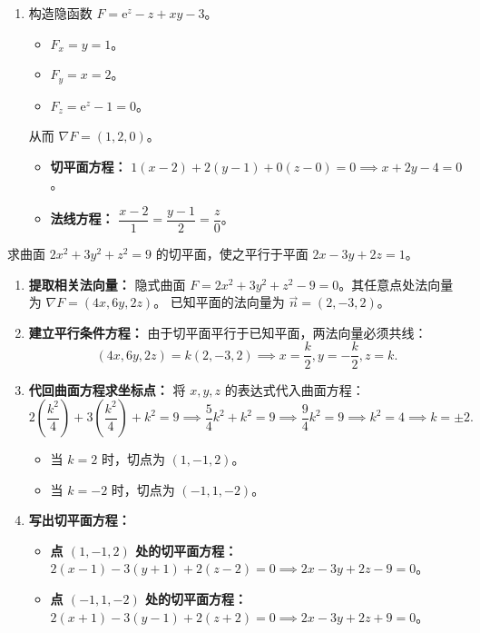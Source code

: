 \documentclass[lang=cn,11pt]{elegantbook}
\begin{document}
\begin{solution}
\begin{enumerate}
    \item[(8)] 构造隐函数 $F = \mathrm{e}^z-z+xy-3$。
    \begin{itemize}
        \item $F_x = y = 1$。
        \item $F_y = x = 2$。
        \item $F_z = \mathrm{e}^z-1 = 0$。
    \end{itemize}
    从而 $\nabla F = (1, 2, 0)$。
    \begin{itemize}
        \item \textbf{切平面方程：} $1(x-2)+2(y-1)+0(z-0)=0 \implies x+2y-4=0$。
        \item \textbf{法线方程：} $\dfrac{x-2}{1}=\dfrac{y-1}{2}=\dfrac{z}{0}$。
    \end{itemize}
\end{enumerate}
\end{solution}

\begin{exercise}[法向量平行应用]
求曲面 $2x^2+3y^2+z^2=9$ 的切平面，使之平行于平面 $2x-3y+2z=1$。
\end{exercise}
\begin{solution}
\begin{enumerate}
    \item \textbf{提取相关法向量：}
    隐式曲面 $F = 2x^2+3y^2+z^2-9=0$。其任意点处法向量为 $\nabla F = (4x, 6y, 2z)$。
    已知平面的法向量为 $\vec{n} = (2, -3, 2)$。
    
    \item \textbf{建立平行条件方程：}
    由于切平面平行于已知平面，两法向量必须共线：
    \[ (4x, 6y, 2z) = k(2, -3, 2) \implies x=\frac{k}{2}, y=-\frac{k}{2}, z=k. \]
    
    \item \textbf{代回曲面方程求坐标点：}
    将 $x, y, z$ 的表达式代入曲面方程：
    \[ 2\left(\frac{k^2}{4}\right) + 3\left(\frac{k^2}{4}\right) + k^2 = 9 \implies \frac{5}{4}k^2 + k^2 = 9 \implies \frac{9}{4}k^2 = 9 \implies k^2=4 \implies k=\pm 2. \]
    \begin{itemize}
        \item 当 $k=2$ 时，切点为 $(1, -1, 2)$。
        \item 当 $k=-2$ 时，切点为 $(-1, 1, -2)$。
    \end{itemize}
    
    \item \textbf{写出切平面方程：}
    \begin{itemize}
        \item \textbf{点 $(1, -1, 2)$ 处的切平面方程：} $2(x-1)-3(y+1)+2(z-2)=0 \implies 2x-3y+2z-9=0$。
        \item \textbf{点 $(-1, 1, -2)$ 处的切平面方程：} $2(x+1)-3(y-1)+2(z+2)=0 \implies 2x-3y+2z+9=0$。
    \end{itemize}
\end{enumerate}
\end{solution}
\end{document}

